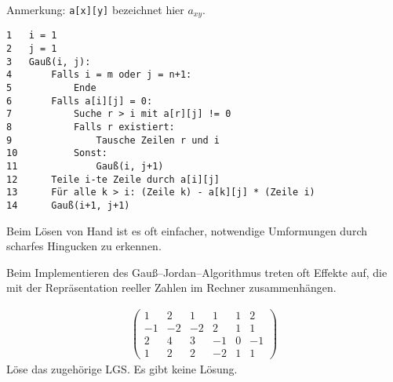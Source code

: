 Anmerkung: \texttt{a[x][y]} bezeichnet hier $a_{xy}$.
\begin{verbatim}
1   i = 1
2   j = 1
3   Gauß(i, j):
4       Falls i = m oder j = n+1:
5           Ende
6       Falls a[i][j] = 0:
7           Suche r > i mit a[r][j] != 0
8           Falls r existiert:
9               Tausche Zeilen r und i
10          Sonst:
11              Gauß(i, j+1)
12      Teile i-te Zeile durch a[i][j]
13      Für alle k > i: (Zeile k) - a[k][j] * (Zeile i)
14      Gauß(i+1, j+1)
\end{verbatim}

Beim Lösen von Hand ist es oft einfacher, notwendige Umformungen durch \glqq{}scharfes Hingucken\grqq{} zu erkennen.

Beim Implementieren des Gauß--Jordan--Algorithmus treten oft Effekte auf, die mit der Repräsentation reeller Zahlen im Rechner zusammenhängen.

\begin{align*}
    \left(\begin{array}{ccccc|c}
        1 & 2 & 1 & 1 & 1 & 2 \\
        -1 & -2 & -2 & 2 & 1 & 1 \\
        2 & 4 & 3 & -1 & 0 & -1 \\
        1 & 2 & 2 & -2 & 1 & 1
    \end{array}\right)
\end{align*}
Löse das zugehörige LGS. Es gibt keine Lösung.
